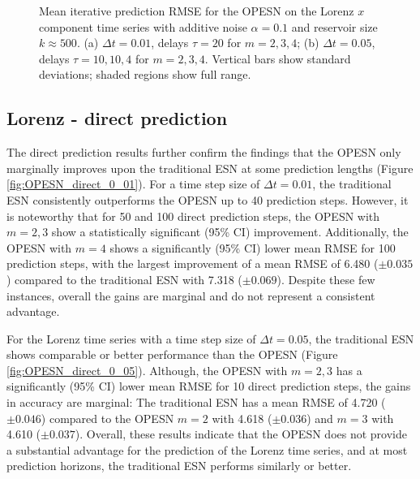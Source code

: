 \begin{figure}
    \caption{Mean iterative prediction RMSE for the OPESN on the Lorenz $x$ component time series with additive noise $\alpha=0.1$ and reservoir size $k\approx500$. (a) $\Delta t = 0.01$, delays $\tau=20$ for $m=2,3,4$; (b) $\Delta t = 0.05$, delays $\tau=10,10,4$ for $m=2,3,4$. Vertical bars show standard deviations; shaded regions show full range.}
    \label{fig:OPESN_iterative}
\end{figure}

\subsection{Lorenz - direct prediction}


The direct prediction results further confirm the findings that the OPESN only marginally improves upon the traditional ESN at some prediction lengths (Figure \ref{fig:OPESN_direct_0_01}). For a time step size of $\Delta t=0.01$, the traditional ESN consistently outperforms the OPESN up to 40 prediction steps. However, it is noteworthy that for 50 and 100 direct prediction steps, the OPESN with $m=2,3$ show a statistically significant (95\% CI) improvement. Additionally, the OPESN with $m=4$ shows a significantly (95\% CI) lower mean RMSE for 100 prediction steps, with the largest improvement of a mean RMSE of 6.480 ($\pm 0.035$) compared to the traditional ESN with 7.318 ($\pm 0.069$). Despite these few instances, overall the gains are marginal and do not represent a consistent advantage.


For the Lorenz time series with a time step size of $\Delta t=0.05$, the traditional ESN shows comparable or better performance than the OPESN (Figure \ref{fig:OPESN_direct_0_05}). Although, the OPESN with $m=2,3$ has a significantly (95\% CI) lower mean RMSE for 10 direct prediction steps, the gains in accuracy are marginal: The traditional ESN has a mean RMSE of 4.720 ($\pm 0.046$) compared to the OPESN $m=2$ with 4.618 ($\pm 0.036$) and $m=3$ with 4.610 ($\pm 0.037$). Overall, these results indicate that the OPESN does not provide a substantial advantage for the prediction of the Lorenz time series, and at most prediction horizons, the traditional ESN performs similarly or better.


